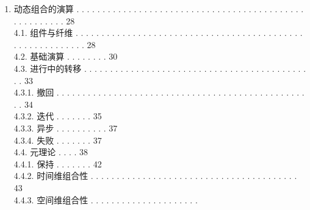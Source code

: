\begin{enumerate}
  . . . . . . . . . . . . . . . . . . . . . . . . . . . . . . . . . . .
  . . . . . . . . . . . . 17\\
  3.2.1. 余效应上下文 \ldots.. . . . . . . . . . . . . . . . . . . .
  . . . . . . . . . . . . . . . . . . . . . 18\\
  3.2.2. 规格与通知 . . . . . . . . . . . . . . . .
  . . . . . . . . . . . . . . . . . . . . . . . . . . . . . 19\\
  3.2.3. 隔离与拦截 . . . . . . . . . . . . . . . . . .
  . . . . . . . . . . . . . . . . . . . . . . . . . . . . . . . 20\\
  3.3. 上下文范式 . . . . . . . . . . . . . . . . . . . . . .
  . . . . . . . . . . . . . . . . . . . . . . . . . . . . . . . . . . .
  . . . . . 22\\
  3.3.1. 统一上下文 . . . . . . . . . . . . . . . . . . . . . . . .
  . . . . . . . . . . . . . . . . . . . 22\\
  3.3.2. 观测等价性 . . . . . . . . . . . . . . . . . . .
  . . . . . . . . . . . . . . . . . . . . . . . . . . . . 23\\
  3.3.3. 上下文范式的定位 . . . . . . . . . . . . . . . .
  . . . . . . . . . . . . . . . . 27\\
\item
  动态组合的演算 . . . . . . . . . . . . . . . . . .
  . . . . . . . . . . . . . . . . . . . . . . . . . . . . . . . . . . .
  . 28\\
  4.1. 组件与纤维 . . . . . . . . . . . . . . . . . . . . . .
  . . . . . . . . . . . . . . . . . . . . . . . . . . . . . . . . . . .
  . 28\\
  4.2. 基础演算 . . . . . . . . 30\\
  4.3. 进行中的转移 . . . . . . . . . . . . . . . . . . . . .
  . . . . . . . . . . . . . . . . . . . . . . . . 33\\
  4.3.1. 撤回 . . . . . . . . . . . . . . . . . . . . . . . . . .
  . . . . . . . . . . . . . . . . . . . . . . . . 34\\
  4.3.2. 迭代 . . . . . . . 35\\
  4.3.3. 异步 . . . . . . . . . . 37\\
  4.3.4. 失败 . . . . . . . 37\\
  4.4. 元理论 . . . . 38\\
  4.4.1. 保持 . . . . . . . 42\\
  4.4.2. 时间维组合性 . . . . . . . . . . . . . . . . . . . .
  . . . . . . . . . . . . . . . . . . . . 43\\
  4.4.3. 空间维组合性 . . . . . . . . . . . . . . . . . . . . .

\end{enumerate}
